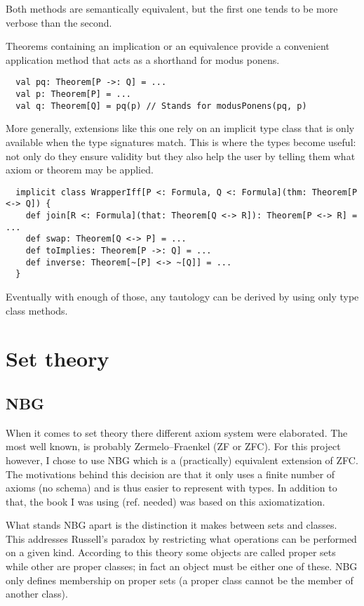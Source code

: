 \documentclass[acmlarge]{acmart}
\begin{document}
Both methods are semantically equivalent, but the first one tends to be more verbose than the second.


Theorems containing an implication or an equivalence provide a convenient application method that acts as a shorthand for modus ponens.

\begin{verbatim}
  val pq: Theorem[P ->: Q] = ...
  val p: Theorem[P] = ...
  val q: Theorem[Q] = pq(p) // Stands for modusPonens(pq, p)
\end{verbatim}

More generally, extensions like this one rely on an implicit type class that is only available when the type signatures match. This is where the types become useful: not only do they ensure validity but they also help the user by telling them what axiom or theorem may be applied.

\begin{verbatim}
  implicit class WrapperIff[P <: Formula, Q <: Formula](thm: Theorem[P <-> Q]) {
    def join[R <: Formula](that: Theorem[Q <-> R]): Theorem[P <-> R] = ...
    def swap: Theorem[Q <-> P] = ...
    def toImplies: Theorem[P ->: Q] = ...
    def inverse: Theorem[~[P] <-> ~[Q]] = ...
  }
\end{verbatim}

Eventually with enough of those, any tautology can be derived by using only type class methods.



\section{Set theory}

\subsection{NBG}

When it comes to set theory there different axiom system were elaborated. The most well known, is probably Zermelo–Fraenkel (ZF or ZFC). For this project however, I chose to use NBG which is a (practically) equivalent extension of ZFC. The motivations behind this decision are that it only uses a finite number of axioms (no schema) and is thus easier to represent with types. In addition to that, the book I was using (ref. needed) was based on this axiomatization.

What stands NBG apart is the distinction it makes between sets and classes. This addresses Russell's paradox by restricting what operations can be performed on a given kind. According to this theory some objects are called proper sets while other are proper classes; in fact an object must be either one of these. NBG only defines membership on proper sets (a proper class cannot be the member of another class).
\end{document}
